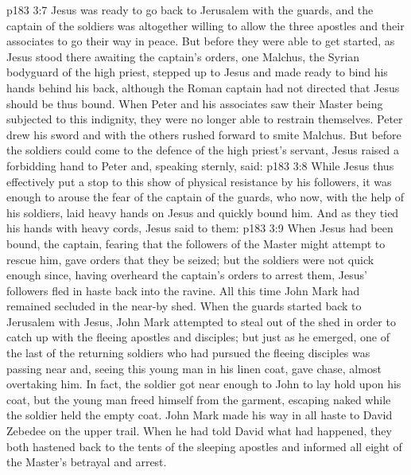 \vs p183 3:7 Jesus was ready to go back to Jerusalem with the guards, and the captain of the soldiers was altogether willing to allow the three apostles and their associates to go their way in peace. But before they were able to get started, as Jesus stood there awaiting the captain’s orders, one Malchus, the Syrian bodyguard of the high priest, stepped up to Jesus and made ready to bind his hands behind his back, although the Roman captain had not directed that Jesus should be thus bound. When Peter and his associates saw their Master being subjected to this indignity, they were no longer able to restrain themselves. Peter drew his sword and with the others rushed forward to smite Malchus. But before the soldiers could come to the defence of the high priest’s servant, Jesus raised a forbidding hand to Peter and, speaking sternly, said: 
\vs p183 3:8 While Jesus thus effectively put a stop to this show of physical resistance by his followers, it was enough to arouse the fear of the captain of the guards, who now, with the help of his soldiers, laid heavy hands on Jesus and quickly bound him. And as they tied his hands with heavy cords, Jesus said to them: 
\vs p183 3:9 When Jesus had been bound, the captain, fearing that the followers of the Master might attempt to rescue him, gave orders that they be seized; but the soldiers were not quick enough since, having overheard the captain’s orders to arrest them, Jesus’ followers fled in haste back into the ravine. All this time John Mark had remained secluded in the near-by shed. When the guards started back to Jerusalem with Jesus, John Mark attempted to steal out of the shed in order to catch up with the fleeing apostles and disciples; but just as he emerged, one of the last of the returning soldiers who had pursued the fleeing disciples was passing near and, seeing this young man in his linen coat, gave chase, almost overtaking him. In fact, the soldier got near enough to John to lay hold upon his coat, but the young man freed himself from the garment, escaping naked while the soldier held the empty coat. John Mark made his way in all haste to David Zebedee on the upper trail. When he had told David what had happened, they both hastened back to the tents of the sleeping apostles and informed all eight of the Master’s betrayal and arrest.
